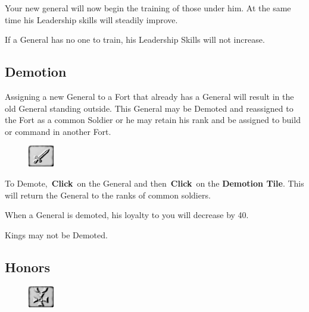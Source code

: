Your new general will now begin the training of those under him. At the same time his Leadership skills will steadily improve.

If a General has no one to train, his Leadership Skills will not increase.

\subsection{Demotion}

Assigning a new General to a Fort that already has a General will result in the old General standing outside. This General may be Demoted and reassigned to the Fort as a common Soldier or he may retain his rank and be assigned to build or command in another Fort.

\begin{figure}
	\vspace{-20pt}
	\begin{center}
		\includegraphics[width=0.1\textwidth]{Tsword}
	\end{center}
	\vspace{-20pt}
\end{figure}

To Demote, \textbf{Click} on the General and then \textbf{Click} on the \textbf{Demotion Tile}. This will return the General to the ranks of common soldiers.

When a General is demoted, his loyalty to you will decrease by 40.

Kings may not be Demoted.

\subsection{Honors}

\begin{figure}
	\vspace{-20pt}
	\begin{center}
		\includegraphics[width=0.1\textwidth]{Tmedal}
	\end{center}
	\vspace{-20pt}
\end{figure}

